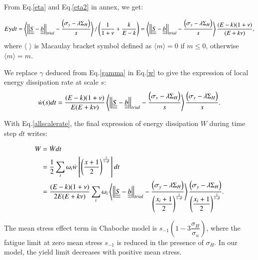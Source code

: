 \documentclass[3p,times,number,review]{elsarticle}
\begin{document}
From Eq.\eqref{eta} and Eq.\eqref{eta2} in annex, we get:

\begin{equation}E\gamma dt=\left\langle \left| \left|\uline{\uline{S}}-\uline{\uline{b}}\right| \right|_{trial}-\dfrac{ \left(\sigma_y-\lambda \Sigma_H\right)}{s}\right\rangle /\left(\dfrac{1}{1+\nu}+\dfrac{k}{E-k} \right)=\left\langle \left| \left|\uline{\uline{S}}-\uline{\uline{b}}\right| \right|_{trial}-\dfrac{ \left(\sigma_y-\lambda \Sigma_H\right)}{s}\right\rangle\dfrac{(E-k)(1+\nu) }{(E+k\nu)},
\label{gamma}
\end{equation}
where $\langle$ $\rangle$ is Macaulay bracket symbol defined as $\langle m\rangle=0$ if $m\leqslant0$, otherwise $\langle m\rangle=m$.

We replace $\gamma$ deduced from Eq.\eqref{gamma} in Eq.\eqref{w} to give the expression of local energy dissipation rate at scale $s$:
\begin{equation}
\dot{w}(s)dt=\dfrac{(E-k)(1+\nu) }{E(E+k\nu)}\left\langle  \left| \left|\uline{\uline{S}}-\uline{\uline{b}}\right| \right|_{trial}-\dfrac{ \left(\sigma_y-\lambda \Sigma_H\right)}{s}\right\rangle \dfrac{ \left(\sigma_y-\lambda \Sigma_H\right)}{s}.
\label{dW}
\end{equation}

With Eq.\eqref{allscalerate}, the final expression of energy dissipation $W$ during time step $dt$ writes:

\begin{equation}
\begin{split}
W&=\dot{W}dt
\\&=\frac{1}{2}\sum_{i}\omega_i\dot{w}\left[  \left( \frac{x+1}{2}\right) ^{\frac{1}{1-\beta}}\right]dt
\\&=\dfrac{(E-k)(1+\nu) }{2E(E+k\nu)}\sum_{i}\omega_i\left\langle  \left| \left|\uline{\uline{S}}-\uline{\uline{b}}\right| \right|_{trial}-\dfrac{\left(\sigma_y-\lambda \Sigma_H\right) }{\left( \dfrac{x_i+1}{2}\right) ^{\frac{1}{1-\beta}}}\right\rangle \dfrac{\left(\sigma_y-\lambda \Sigma_H\right) }{\left( \dfrac{x_i+1}{2}\right)^{\frac{1}{1-\beta}}}.
\end{split}
\label{finaldw}
\end{equation}

The mean stress effect term in Chaboche model is $s_{-1}\left(1-3\dfrac{\sigma_H}{\sigma_u} \right)$, where the fatigue limit at zero mean stress $s_{-1}$ is reduced in the presence of $\sigma_H$. In our model, the yield limit decreases with positive mean stress. 
\end{document}
